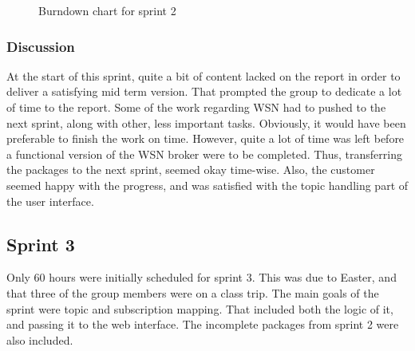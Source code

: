 \begin{center}
  \begin{figure}[ht!]
    \caption{Burndown chart for sprint 2}
    \label{fig:sprint 2, burndown}
  \end{figure}
\end{center}

\subsubsection{Discussion}
\label{subsec:project_lifecycle-development-sprint_2-discussion}

At the start of this sprint, quite a bit of content lacked on the report in order to deliver a satisfying mid term version. That prompted the group to dedicate a lot of time to the report. Some of the work regarding WSN had to pushed to the next sprint, along with other, less important tasks. Obviously, it would have been preferable to finish the work on time. However, quite a lot of time was left before a functional version of the WSN broker were to be completed. Thus, transferring the packages to the next sprint, seemed okay time-wise. Also, the customer seemed happy with the progress, and was satisfied with the topic handling part of the user interface.

\subsection{Sprint 3}
\label{subsec:project_lifecycle-development-sprint_3}

Only 60 hours were initially scheduled for sprint 3. This was due to Easter, and that three of the group members were on a class trip. The main goals of the sprint were topic and subscription mapping. That included both the logic of it, and passing it to the web interface. The incomplete packages from sprint 2 were also included.

